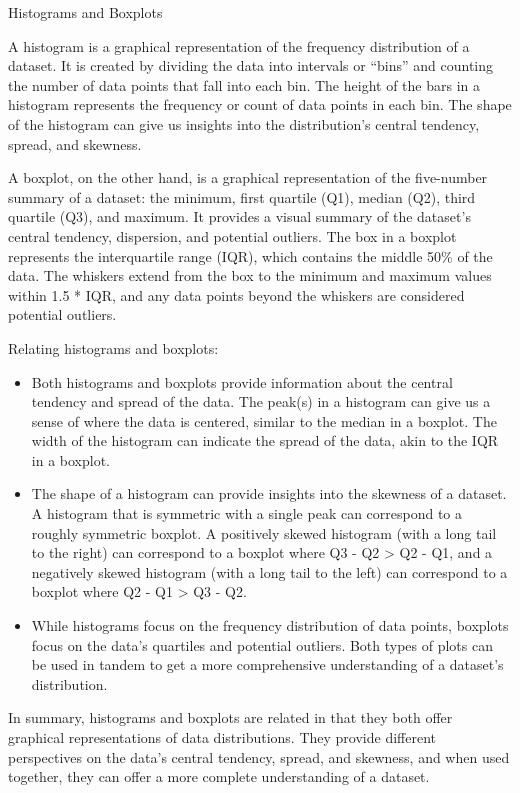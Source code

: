 \documentclass[
  letterpaper,
]{latex/krantz}
\providecommand{\tightlist}{%
  \setlength{\itemsep}{0pt}\setlength{\parskip}{0pt}}\usepackage{longtable,booktabs,array}
\begin{document}
\begin{tcolorbox}[enhanced jigsaw, left=2mm, arc=.35mm, colback=white, rightrule=.15mm, toprule=.15mm, breakable, leftrule=.75mm, opacityback=0, bottomrule=.15mm]

Histograms and Boxplots

A histogram is a graphical representation of the frequency distribution
of a dataset. It is created by dividing the data into intervals or
``bins'' and counting the number of data points that fall into each bin.
The height of the bars in a histogram represents the frequency or count
of data points in each bin. The shape of the histogram can give us
insights into the distribution's central tendency, spread, and skewness.

A boxplot, on the other hand, is a graphical representation of the
five-number summary of a dataset: the minimum, first quartile (Q1),
median (Q2), third quartile (Q3), and maximum. It provides a visual
summary of the dataset's central tendency, dispersion, and potential
outliers. The box in a boxplot represents the interquartile range (IQR),
which contains the middle 50\% of the data. The whiskers extend from the
box to the minimum and maximum values within 1.5 * IQR, and any data
points beyond the whiskers are considered potential outliers.

Relating histograms and boxplots:

\begin{itemize}
\tightlist
\item
  Both histograms and boxplots provide information about the central
  tendency and spread of the data. The peak(s) in a histogram can give
  us a sense of where the data is centered, similar to the median in a
  boxplot. The width of the histogram can indicate the spread of the
  data, akin to the IQR in a boxplot.
\item
  The shape of a histogram can provide insights into the skewness of a
  dataset. A histogram that is symmetric with a single peak can
  correspond to a roughly symmetric boxplot. A positively skewed
  histogram (with a long tail to the right) can correspond to a boxplot
  where Q3 - Q2 \textgreater{} Q2 - Q1, and a negatively skewed
  histogram (with a long tail to the left) can correspond to a boxplot
  where Q2 - Q1 \textgreater{} Q3 - Q2.
\item
  While histograms focus on the frequency distribution of data points,
  boxplots focus on the data's quartiles and potential outliers. Both
  types of plots can be used in tandem to get a more comprehensive
  understanding of a dataset's distribution.
\end{itemize}

In summary, histograms and boxplots are related in that they both offer
graphical representations of data distributions. They provide different
perspectives on the data's central tendency, spread, and skewness, and
when used together, they can offer a more complete understanding of a
dataset.

\end{tcolorbox}
\end{document}
